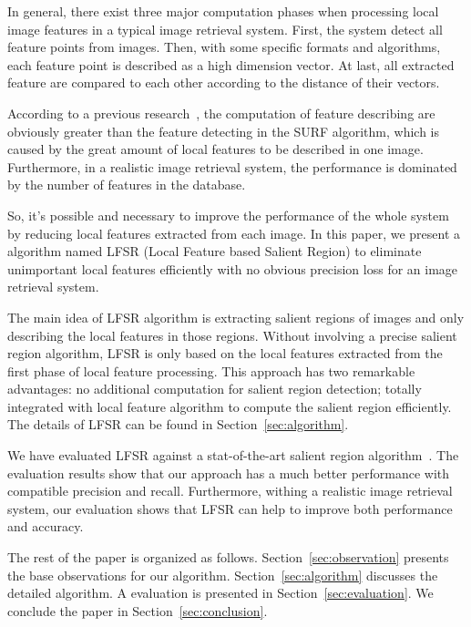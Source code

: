 In general, there exist three major computation phases when processing local image features in a typical image retrieval system. First, the system detect all feature points from images. Then, with some specific formats and algorithms, each feature point is described as a high dimension vector. At last, all extracted feature are compared to each other according to the distance of their vectors.

According to a previous research~\cite{Fang2011ispass}, the computation of feature describing are obviously greater than the feature detecting in the SURF algorithm, which is caused by the great amount of local features to be described in one image. Furthermore, in a realistic image retrieval system, the performance is dominated by the number of features in the database.

So, it's possible and necessary to improve the performance of the whole system by reducing local features extracted from each image. In this paper, we present a algorithm named LFSR (Local Feature based Salient Region) to eliminate unimportant local features efficiently with no obvious precision loss for an image retrieval system.

The main idea of LFSR algorithm is extracting salient regions of images and only describing the local features in those regions. Without involving a precise salient region algorithm, LFSR is only based on the local features extracted from the first phase of local feature processing. This approach has two remarkable advantages: no additional computation for salient region detection; totally integrated with local feature algorithm to compute the salient region efficiently. The details of LFSR can be found in Section~\ref{sec:algorithm}. 

We have evaluated LFSR against a stat-of-the-art salient region algorithm~\cite{achanta2009frequency}. The evaluation results show that our approach has a much better performance with compatible precision and recall. Furthermore, withing a realistic image retrieval system, our evaluation shows that LFSR can help to improve both performance and accuracy.

The rest of the paper is organized as follows. Section~\ref{sec:observation} presents the base observations for our algorithm. Section~\ref{sec:algorithm} discusses the detailed algorithm. A evaluation is presented in Section~\ref{sec:evaluation}. We conclude the paper in Section~\ref{sec:conclusion}.